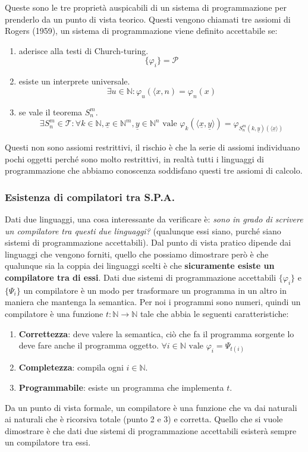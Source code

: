 \documentclass{article}
\begin{document}
Queste sono le tre proprietà auspicabili di un sistema di programmazione per prenderlo da un punto
di vista teorico. Questi vengono chiamati tre assiomi di Rogers (1959), un sistema di programmazione viene
definito accettabile se:
\begin{enumerate}
    \item aderisce alla testi di Church-turing.$$\{\varphi_i\}=\mathcal{P}$$
    \item esiste un interprete universale.$$\exists u\in\mathbb{N}:\varphi_u\left(\langle x,n\right)=\varphi_n(x)$$
    \item se vale il teorema $S_n^m$.$$\exists S_n^m\in\mathcal{T}:\forall k\in\mathbb{N},\underline{x}\in\mathbb{N}^m,\underline{y}\in\mathbb{N}^n\text{ vale }\varphi_k\left(\langle\underline{x},\underline{y}\rangle\right)=\varphi_{S_n^m(k,\underline{y}) (\langle\underline{x}\rangle)}$$
\end{enumerate}
Questi non sono assiomi restrittivi, il rischio è che la serie di assiomi individuano pochi oggetti
perché sono molto restrittivi, in realtà tutti i linguaggi di programmazione che abbiamo
conoscenza soddisfano questi tre assiomi di calcolo.

\subsubsection{Esistenza di compilatori tra S.P.A.}
Dati due linguaggi, una cosa interessante da verificare è: \textit{sono in grado di scrivere
    un compilatore tra questi due linguaggi?} (qualunque essi siano, purché siano sistemi di programmazione
accettabili). Dal punto di vista pratico dipende dai linguaggi che vengono forniti, quello che possiamo
dimostrare però è che qualunque sia la coppia dei linguaggi scelti è che \textbf{sicuramente
    esiste un compilatore tra di essi}.
Dati due sistemi di programmazione accettabili $\{\varphi_i\}$ e $\{\Psi_i\}$ un compilatore è un modo
per trasformare un programma in un altro in maniera che mantenga la semantica. Per noi i
programmi sono numeri, quindi un compilatore è una funzione $t:\mathbb{N}\rightarrow\mathbb{N}$
tale che abbia le seguenti caratteristiche:
\begin{enumerate}
    \item \textbf{Correttezza}: deve valere la semantica, ciò che fa il programma sorgente
          lo deve fare anche il programma oggetto. $\forall i\in\mathbb{N}\text{ vale }\varphi_i=\Psi_{t(i)}$
    \item \textbf{Completezza}: compila ogni $i\in\mathbb{N}$.
    \item \textbf{Programmabile}: esiste un programma che implementa $t$.
\end{enumerate}
Da un punto di vista formale, un compilatore è una funzione che va dai naturali ai naturali che
è ricorsiva totale (punto 2 e 3) e corretta. Quello che si vuole dimostrare è che dati due sistemi di programmazione accettabili
esisterà sempre un compilatore tra essi.
\end{document}
